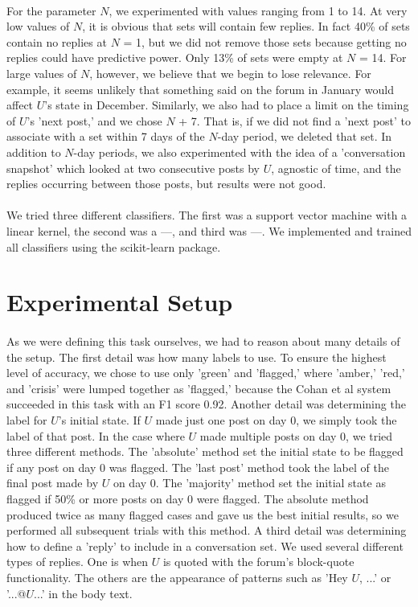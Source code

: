\documentclass{article}
\begin{document}
\paragraph{}For the parameter $N$, we experimented with values ranging from 1 to 14. At very low values of $N$, it is obvious that sets will contain few replies. In fact 40\% of sets contain no replies at $N$ = 1, but we did not remove those sets because getting no replies could have predictive power. Only 13\% of sets were empty at $N$ = 14. For large values of $N$, however, we believe that we begin to lose relevance. For example, it seems unlikely that something said on the forum in January would affect $U$'s state in December. Similarly, we also had to place a limit on the timing of $U$'s 'next post,' and we chose $N$ + 7. That is, if we did not find a 'next post' to associate with a set within 7 days of the $N$-day period, we deleted that set. In addition to $N$-day periods, we also experimented with the idea of a 'conversation snapshot' which looked at two consecutive posts by $U$, agnostic of time, and the replies occurring between those posts, but results were not good.

\paragraph{}We tried three different classifiers. The first was a support vector machine with a linear kernel, the second was a ---, and third was ---. We implemented and trained all classifiers using the scikit-learn package.

\section{Experimental Setup}

\paragraph{}As we were defining this task ourselves, we had to reason about many details of the setup. The first detail was how many labels to use. To ensure the highest level of accuracy, we chose to use only 'green' and 'flagged,' where 'amber,' 'red,' and 'crisis' were lumped together as 'flagged,' because the Cohan et al system succeeded in this task with an F1 score 0.92. Another detail was determining the label for $U$'s initial state. If $U$ made just one post on day 0, we simply took the label of that post. In the case where $U$ made multiple posts on day 0, we tried three different methods. The 'absolute' method set the initial state to be flagged if any post on day 0 was flagged. The 'last post' method took the label of the final post made by $U$ on day 0. The 'majority' method set the initial state as flagged if 50\% or more posts on day 0 were flagged. The absolute method produced twice as many flagged cases and gave us the best initial results, so we performed all subsequent trials with this method. A third detail was determining how to define a 'reply' to include in a conversation set. We used several different types of replies. One is when $U$ is quoted with the forum's block-quote functionality. The others are the appearance of patterns such as 'Hey $U$, ...' or '...@$U$...' in the body text.
\end{document}
